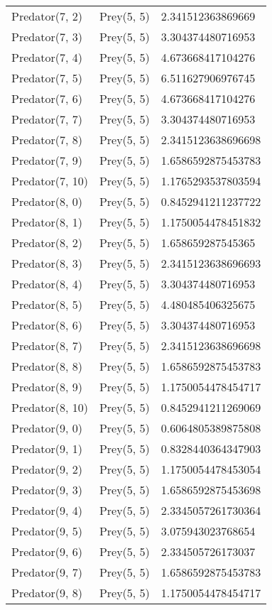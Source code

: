 \begin{longtable}{| p{} | p{} | p{} |}
Predator(7, 2) & Prey(5, 5) &2.341512363869669\\
Predator(7, 3) & Prey(5, 5) &3.304374480716953\\
Predator(7, 4) & Prey(5, 5) &4.673668417104276\\
Predator(7, 5) & Prey(5, 5) &6.511627906976745\\
Predator(7, 6) & Prey(5, 5) &4.673668417104276\\
Predator(7, 7) & Prey(5, 5) &3.304374480716953\\
Predator(7, 8) & Prey(5, 5) &2.3415123638696698\\
Predator(7, 9) & Prey(5, 5) &1.6586592875453783\\
Predator(7, 10) & Prey(5, 5) &1.1765293537803594\\
Predator(8, 0) & Prey(5, 5) &0.8452941211237722\\
Predator(8, 1) & Prey(5, 5) &1.1750054478451832\\
Predator(8, 2) & Prey(5, 5) &1.658659287545365\\
Predator(8, 3) & Prey(5, 5) &2.3415123638696693\\
Predator(8, 4) & Prey(5, 5) &3.304374480716953\\
Predator(8, 5) & Prey(5, 5) &4.480485406325675\\
Predator(8, 6) & Prey(5, 5) &3.304374480716953\\
Predator(8, 7) & Prey(5, 5) &2.3415123638696698\\
Predator(8, 8) & Prey(5, 5) &1.6586592875453783\\
Predator(8, 9) & Prey(5, 5) &1.1750054478454717\\
Predator(8, 10) & Prey(5, 5) &0.8452941211269069\\
Predator(9, 0) & Prey(5, 5) &0.6064805389875808\\
Predator(9, 1) & Prey(5, 5) &0.8328440364347903\\
Predator(9, 2) & Prey(5, 5) &1.1750054478453054\\
Predator(9, 3) & Prey(5, 5) &1.6586592875453698\\
Predator(9, 4) & Prey(5, 5) &2.3345057261730364\\
Predator(9, 5) & Prey(5, 5) &3.075943023768654\\
Predator(9, 6) & Prey(5, 5) &2.334505726173037\\
Predator(9, 7) & Prey(5, 5) &1.6586592875453783\\
Predator(9, 8) & Prey(5, 5) &1.1750054478454717\\

\end{longtable}
